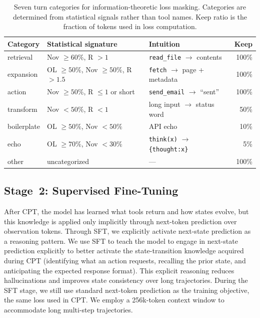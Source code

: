 \documentclass{llmxive}
\begin{document}
\begin{table}[!ht]
\centering
\small
\begin{tabular}{@{}lp{4.5cm}p{4cm}r@{}}
\toprule
\textbf{Category} & \textbf{Statistical signature} & \textbf{Intuition} & \textbf{Keep} \\
\midrule
retrieval    & Nov $\geq 60\%$, R $> 1$           & \texttt{read\_file} $\to$ contents       & 100\% \\
expansion    & OL $\geq 50\%$, Nov $\geq 50\%$, R $> 1.5$ & \texttt{fetch} $\to$ page + metadata & 100\% \\
action       & Nov $\geq 50\%$, R $\leq 1$ or short & \texttt{send\_email} $\to$ ``sent''     & 100\% \\
transform    & Nov $< 50\%$, R $< 1$               & long input $\to$ status word            & 50\%  \\
boilerplate  & OL $\geq 50\%$, Nov $< 50\%$        & API echo                                & 10\%  \\
echo         & OL $\geq 70\%$, Nov $< 30\%$        & \texttt{think(x)} $\to$ \texttt{\{thought:x\}} & 5\% \\
other        & uncategorized                       & ---                                     & 100\% \\
\bottomrule
\end{tabular}
\caption{Seven turn categories for information-theoretic loss masking. Categories are determined from statistical signals rather than tool names. Keep ratio is the fraction of tokens used in loss computation.}
\label{tab:loss_mask_categories}
\end{table}


\subsection{Stage~2: Supervised Fine-Tuning}
\label{sec:pipeline:sft}

After CPT, the model has learned what tools return and how states evolve, but this knowledge is applied only implicitly through next-token prediction over observation tokens.
Through SFT, we explicitly activate next-state prediction as a reasoning pattern.
We use SFT to teach the model to engage in next-state prediction explicitly to better activate the state-transition knowledge acquired during CPT (identifying what an action requests, recalling the prior state, and anticipating the expected response format).
This explicit reasoning reduces hallucinations and improves state consistency over long trajectories.
During the SFT stage, we still use standard next-token prediction as the training objective, the same loss used in CPT.
We employ a 256k-token context window to accommodate long multi-step trajectories.
\end{document}

